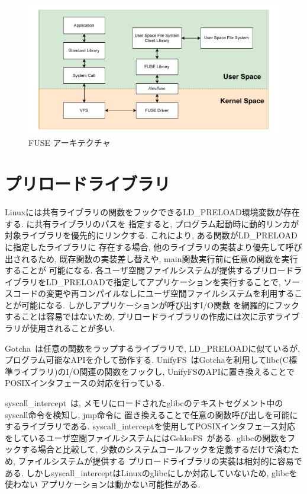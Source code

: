 \documentclass[a4paper,11pt]{jreport}
\begin{document}
\newpage


\begin{figure}[h]
	\begin{minipage}[b]{1\columnwidth}
		\centering
		\includegraphics[width=0.9\linewidth]{./figure/FUSE.pdf}
		\caption{FUSE アーキテクチャ}
		\label{fig:FUSE}
	\end{minipage}
\end{figure}

\newpage


\section{プリロードライブラリ}
Linuxには共有ライブラリの関数をフックできるLD\_PRELOAD環境変数が存在する. に共有ライブラリのパスを
指定すると, プログラム起動時に動的リンカが対象ライブラリを優先的にリンクする. これにより, ある関数がLD\_PRELOADに指定したライブラリに
存在する場合, 他のライブラリの実装より優先して呼び出されるため, 既存関数の実装差し替えや, main関数実行前に任意の関数を実行することが
可能になる. 各ユーザ空間ファイルシステムが提供するプリロードライブラリをLD\_PRELOADで指定してアプリケーションを実行することで, 
ソースコードの変更や再コンパイルなしにユーザ空間ファイルシステムを利用することが可能になる. しかしアプリケーションが呼び出すI/O関数
を網羅的にフックすることは容易ではないため, プリロードライブラリの作成には次に示すライブラリが使用されることが多い. 

Gotcha~\cite{gotcha}は任意の関数をラップするライブラリで, LD\_PRELOADに似ているが, プログラム可能なAPIを介して動作する. 
UnifyFS~\cite{10177390}はGotchaを利用してlibc(C標準ライブラリ)のI/O関連の関数をフックし, UnifyFSのAPIに置き換えることで
POSIXインタフェースの対応を行っている.

syscall\_intercept~\cite{syscall-intercept}は, メモリにロードされたglibcのテキストセグメント中のsyscall命令を検知し, jmp命令に
置き換えることで任意の関数呼び出しを可能にするライブラリである.
syscall\_interceptを使用してPOSIXインタフェース対応をしているユーザ空間ファイルシステムにはGekkoFS~\cite{8514892}がある.
glibcの関数をフックする場合と比較して, 少数のシステムコールフックを定義するだけで済むため, ファイルシステムが提供する
プリロードライブラリの実装は相対的に容易である. しかしsyscall\_interceptはLinuxのglibcにしか対応していないため, glibcを使わない
アプリケーションは動かない可能性がある.
\end{document}

